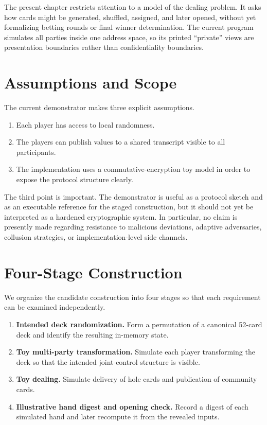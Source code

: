 The present chapter restricts attention to a model of the dealing problem.  It
asks how cards might be generated, shuffled, assigned, and later opened,
without yet formalizing betting rounds or final winner determination.  The
current program simulates all parties inside one address space, so its printed
``private'' views are presentation boundaries rather than confidentiality
boundaries.

\section{Assumptions and Scope}
The current demonstrator makes three explicit assumptions.
\begin{enumerate}
    \item Each player has access to local randomness.
    \item The players can publish values to a shared transcript visible to all
    participants.
    \item The implementation uses a commutative-encryption toy model in order
    to expose the protocol structure clearly.
\end{enumerate}

The third point is important. The demonstrator is useful as a protocol sketch
and as an executable reference for the staged construction, but it should not
yet be interpreted as a hardened cryptographic system. In particular, no claim
is presently made regarding resistance to malicious deviations, adaptive
adversaries, collusion strategies, or implementation-level side channels.

\section{Four-Stage Construction}
We organize the candidate construction into four stages so that each
requirement can be
examined independently.
\begin{enumerate}
    \item \textbf{Intended deck randomization.} Form a permutation of a
    canonical 52-card deck and identify the resulting in-memory state.
    \item \textbf{Toy multi-party transformation.} Simulate each player
    transforming the deck so that the intended joint-control structure is
    visible.
    \item \textbf{Toy dealing.} Simulate delivery of hole cards and publication
    of community cards.
    \item \textbf{Illustrative hand digest and opening check.} Record a digest
    of each simulated hand and later recompute it from the revealed inputs.
\end{enumerate}

